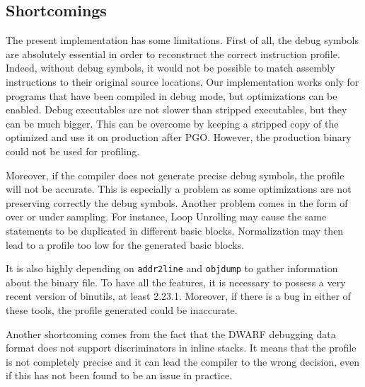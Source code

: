 \documentclass[9pt,english,twocolumn,letter]{article}
\begin{document}
\subsection{Shortcomings}

The present implementation has some limitations. First of all, the debug symbols are absolutely essential in order to reconstruct the correct instruction profile. Indeed, without debug symbols, it would not be possible to match assembly instructions to their original source locations. Our implementation works only for programs that have been compiled in debug mode, but optimizations can be enabled. Debug executables are not slower than stripped executables, but they can be much bigger. This can be overcome by keeping a stripped copy of the optimized and use it on production after PGO. However, the production binary could not be used for profiling.

Moreover, if the compiler does not generate precise debug symbols, the profile will not be accurate. This is especially a problem as some optimizations are not preserving correctly the debug symbols. Another problem comes in the form of over or under sampling. For instance, Loop Unrolling may cause the same statements to be duplicated in different basic blocks. Normalization may then lead to a profile too low for the generated basic blocks.

It is also highly depending on \texttt{addr2line} and \texttt{objdump} to gather information about the binary file. To have all the features, it is necessary to  possess a very recent version of binutils, at least 2.23.1. Moreover, if there is a bug in either of these tools, the profile generated could be inaccurate.

Another shortcoming comes from the fact that the DWARF debugging data format does not support discriminators in inline stacks. It means that the profile is not completely precise and it can lead the compiler to the wrong decision, even if this has not been found to be an issue in practice.
\end{document}
